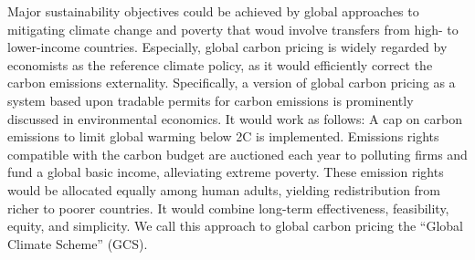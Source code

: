 Major sustainability objectives could be achieved by global approaches to mitigating climate change and poverty that woud involve transfers from high- to lower-income countries.\citep{budolfson_climate_2021,franks_mobilizing_2018,dennig_inequality_2015,soergel_combining_2021,bauer_quantification_2020,cramton_global_2017} 
Especially, global carbon pricing is widely regarded by economists as the reference climate policy, as it would efficiently correct the carbon emissions externality. Specifically, a version of global carbon pricing as a system based upon tradable permits for carbon emissions is prominently discussed in environmental economics.\citep{grubb_greenhouse_1990,hoel_carbon_1991,agarwal_global_1991,bertram_tradeable_1992,baer_equity_2000,jamieson_climate_2001,blanchard_major_2021} It would work as follows: A cap on carbon emissions to limit global warming below 2\textdegree{}C is implemented. Emissions rights compatible with the carbon budget are auctioned each year to polluting firms and fund a global basic income, alleviating extreme poverty. These emission rights would be allocated 
equally among human adults, yielding redistribution from richer to poorer countries. It would combine long-term effectiveness, feasibility, equity, and simplicity.\citep{grubb_greenhouse_1990} We call this approach to global carbon pricing the ``Global Climate Scheme'' (GCS).


